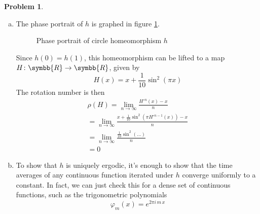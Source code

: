 \documentclass[a4paper, 12pt]{article}
\theoremstyle{definition}
\newtheorem{problem}{Problem}
\newcommand*{\reals}{\symbb{R}}
\begin{document}
\begin{problem}
~
\begin{enumerate}[a)]
    \item The phase portrait of \(h\) is graphed in figure \ref{fig:phase_portrait_of_h}.
    \begin{figure}[htbp]
        \centering
        \caption{Phase portrait of circle homeomorphism \(h\)}
        \label{fig:phase_portrait_of_h}
    \end{figure}

    Since \(h (0) = h (1)\), this homeomorphism can be lifted to a map \(H \colon \reals \to \reals\), given by
    \[
        H(x) = x + \frac{1}{10} \sin^2 (\pi x)
    \]
    The rotation number is then
    \begin{gather*}
        \rho(H) = \lim_{n \to \infty} \frac{H^{\circ n} (x) - x}{n} \\
        = \lim_{n \to \infty} \frac{x + \frac{1}{10} \sin^2 \left(\pi H^{\circ n - 1}(x)\right) - x}{n} \\
        = \lim_{n \to \infty} \frac{\frac{1}{10} \sin^2 (\dots)}{n} \\
        = 0
    \end{gather*}

    \item To show that \(h\) is uniquely ergodic, it's enough to show that the time averages of any continuous function iterated under \(h\) converge uniformly to a constant. In fact, we can just check this for a dense set of continuous functions, such as the trigonometric polynomials
    \[
        \varphi_m (x) = e^{2 \pi i \, m \, x}
    \]


\end{enumerate}
\end{problem}
\end{document}
